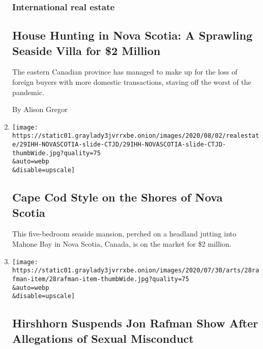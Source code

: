 \begin{enumerate}
{  \subsubsection{International real
  estate}\label{international-real-estate}}

  \hypertarget{house-hunting-in-nova-scotia-a-sprawling-seaside-villa-for-2-million}{%
  \subsection{House Hunting in Nova Scotia: A Sprawling Seaside Villa
  for \$2
  Million}\label{house-hunting-in-nova-scotia-a-sprawling-seaside-villa-for-2-million}}

  The eastern Canadian province has managed to make up for the loss of
  foreign buyers with more domestic transactions, staving off the worst
  of the pandemic.

  By Alison Gregor
\item
  \href{/slideshow/2020/07/29/realestate/cape-cod-style-on-the-shores-of-nova-scotia.html}{}

  \texttt{[image: https://static01.graylady3jvrrxbe.onion/images/2020/08/02/realestate/29IHH-NOVASCOTIA-slide-CTJD/29IHH-NOVASCOTIA-slide-CTJD-thumbWide.jpg?quality=75\\\&auto=webp\\\&disable=upscale]}

  \hypertarget{cape-cod-style-on-the-shores-of-nova-scotia}{%
  \subsection{Cape Cod Style on the Shores of Nova
  Scotia}\label{cape-cod-style-on-the-shores-of-nova-scotia}}

  This five-bedroom seaside mansion, perched on a headland jutting into
  Mahone Bay in Nova Scotia, Canada, is on the market for \$2 million.
\item
  \href{/2020/07/28/arts/design/hirshhorn-museum-jon-rafman.html}{}

  \texttt{[image: https://static01.graylady3jvrrxbe.onion/images/2020/07/30/arts/28rafman-item/28rafman-item-thumbWide.jpg?quality=75\\\&auto=webp\\\&disable=upscale]}

  \hypertarget{hirshhorn-suspends-jon-rafman-show-after-allegations-of-sexual-misconduct}{%
  \subsection{Hirshhorn Suspends Jon Rafman Show After Allegations of
  Sexual
  Misconduct}\label{hirshhorn-suspends-jon-rafman-show-after-allegations-of-sexual-misconduct}}


\end{enumerate}
